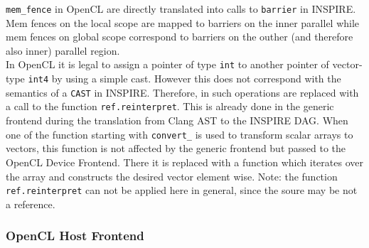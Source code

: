 \texttt{mem\_fence} in OpenCL are directly translated into calls to \texttt{barrier} in INSPIRE. Mem fences on the local scope are mapped to barriers on the inner parallel while mem fences on global scope correspond to barriers on the outher (and therefore also inner) parallel region. \\

In OpenCL it is legal to assign a pointer of type \texttt{int} to another pointer of vector-type \texttt{int4} by using a simple cast. However this does not correspond with the semantics of a \texttt{CAST} in INSPIRE. Therefore, in such operations are replaced with a call to the function \texttt{ref.reinterpret}. This is already done in the generic frontend during the translation from Clang AST to the INSPIRE DAG. When one of the function starting with \texttt{convert\_} is used to transform scalar arrays to vectors, this function is not affected by the generic frontend but passed to the OpenCL Device Frontend. There it is replaced with a function which iterates over the array and constructs the desired vector element wise. Note: the function \texttt{ref.reinterpret} can not be applied here in general, since the soure may be not a reference. \\




\subsubsection{OpenCL Host Frontend}
\label{sec:Insieme.HostCL}

